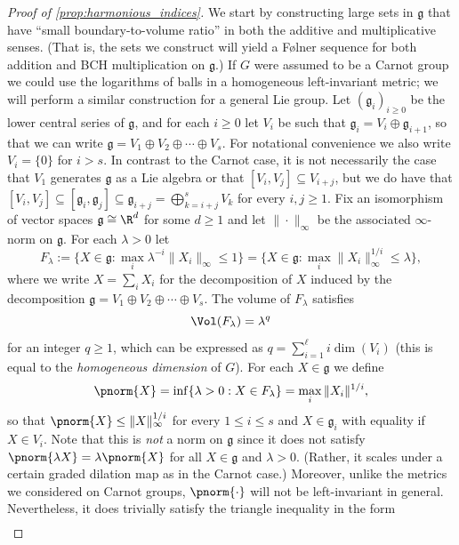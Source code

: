 \begin{proof}[Proof of \cref{prop:harmonious_indices}]
%
%
%
%
%
%
%
%
%
%
%
%
%
%
%
%
%
We start by constructing large sets in $\mathfrak{g}$ that have ``small boundary-to-volume ratio'' in both the additive and multiplicative senses. (That is, the sets we construct will yield a F{\o}lner sequence for both addition and BCH multiplication on $\mathfrak{g}$.)  If $G$ were assumed to be a Carnot group we could use the logarithms of balls in a homogeneous left-invariant metric; we will perform a similar construction for a general Lie group. Let $(\mathfrak{g}_i)_{i\geq 0}$ be the lower central series of $\mathfrak{g}$, and for each $i\geq 0$ let $V_i$ be such that $\mathfrak{g}_i = V_i \oplus \mathfrak{g}_{i+1}$, so that we can write $\mathfrak{g}=V_1 \oplus V_2 \oplus \cdots \oplus V_s$. For notational convenience we also write $V_i=\{0\}$ for $i>s$. In contrast to the Carnot case, it is not necessarily the case that $V_1$ generates $\mathfrak{g}$ as a Lie algebra or that $[V_i,V_j]\subseteq V_{i+j}$, but we do have that $[V_{i},V_j] \subseteq [\mathfrak{g}_i,\mathfrak{g}_j] \subseteq \mathfrak{g}_{i+j} =  \bigoplus_{k = i+j}^sV_{k}$ for every $i,j \geq 1$.
Fix an isomorphism of vector spaces $\mathfrak{g} \cong \R^d$ for some $d\geq 1$ and let $\|\cdot \|_\infty$ be the associated $\infty$-norm on $\mathfrak{g}$. For each $\lambda>0$ let
\[
F_\lambda := \{X\in \mathfrak{g}: \max_i \lambda^{-i}\|X_i\|_\infty \leq 1\}=\{X\in \mathfrak{g}: \max_i \|X_i\|_\infty^{1/i} \leq \lambda\},
\]
where we write $X=\sum_i X_i$ for the decomposition of $X$ induced by the decomposition $\mathfrak{g}=V_1 \oplus V_2 \oplus \cdots \oplus V_s$. The volume of $F_\lambda$ satisfies
\[\Vol (F_\lambda)=\lambda^q\] for an integer $q\geq 1$, which can be expressed as $q=\sum_{i=1}^\ell i \dim(V_i)$ (this is equal to the \emph{homogeneous dimension} of $G$). For each $X\in \mathfrak{g}$ we define
\[
\pnorm{X}=\inf \{\lambda>0: X\in F_\lambda\} = \max_i \|X_i\|^{1/i},
\]
so that $\pnorm{X} \leq \|X\|_\infty^{1/i}$ for every $1\leq i \leq s$ and $X \in \mathfrak{g}_i$ with equality if $X\in V_i$.
Note that this is \emph{not} a norm on $\mathfrak{g}$ since it does not satisfy $\pnorm{\lambda X}=\lambda \pnorm{X}$ for all $X\in \mathfrak{g}$ and $\lambda>0$. (Rather, it scales under a certain graded dilation map as in the Carnot case.) Moreover, unlike the metrics we considered on Carnot groups, $\pnorm{\cdot}$ will not be left-invariant in general. Nevertheless, it does trivially satisfy the triangle inequality in the form
\begin{multline}\label{eq:pnorm_triangle}

\end{multline}
\end{proof}
